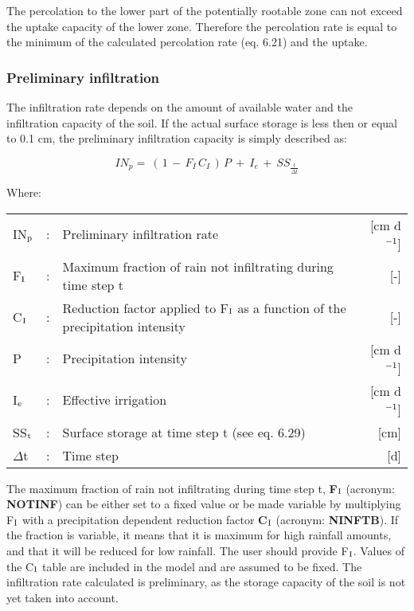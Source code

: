 The percolation to the lower part of the potentially rootable zone can not exceed the
uptake capacity of the lower zone. Therefore the percolation rate is equal to the minimum
of the calculated percolation rate (eq. 6.21) and the uptake.

\subsubsection{Preliminary infiltration}
The infiltration rate depends on the amount of available water and the infiltration capacity
of the soil. If the actual surface storage is less then or equal to 0.1 cm, the preliminary
infiltration capacity is simply described as:

\begin{equation}
IN_{p} =~ (\, 1\, -\, F _{I} \, C _{I} \, )\, P~+~ I _{e~} +~ SS _{\frac{t}{ \Delta t}} 
\end{equation}

Where:\\[5pt]
\begin{tabularx}{\textwidth}{llXr}
IN$_{{\rm p}}$ &:& Preliminary infiltration rate  & [cm d$^{{\rm -1}}$]\\
F$_{{\rm I}}$ &:& Maximum fraction of rain not infiltrating during time step t  & [-]\\
C$_{{\rm I}}$ &:& Reduction factor applied to F$_{{\rm I}}$ as a function of the 
   precipitation intensity  & [-]\\
P &:& Precipitation intensity  & [cm d$^{{\rm -1}}$]\\
I$_{{\rm e}}$ &:& Effective irrigation  & [cm d$^{{\rm -1}}$]\\
SS$_{{\rm t}}$ &:& Surface storage at time step t (see eq. 6.29)  & [cm]\\
$\Delta$t &:& Time step  & [d]\\
\end{tabularx}

The maximum fraction of rain not infiltrating during time step t, {\bf F$_{{\rm I}}$} 
(acronym: {\bf NOTINF})
can be either set to a fixed value or be made variable by multiplying F$_{{\rm I}}$ 
with a precipitation dependent reduction factor {\bf C$_{{\rm I}}$} (acronym: {\bf NINFTB}). 
If the fraction is variable, it means that it is maximum for high rainfall amounts, and 
that it will be reduced for low rainfall. The user should provide F$_{{\rm I}}$. 
Values of the C$_{{\rm I}}$ table are included in the model and
are assumed to be fixed. The infiltration rate calculated is preliminary, as the storage
capacity of the soil is not yet taken into account. 

